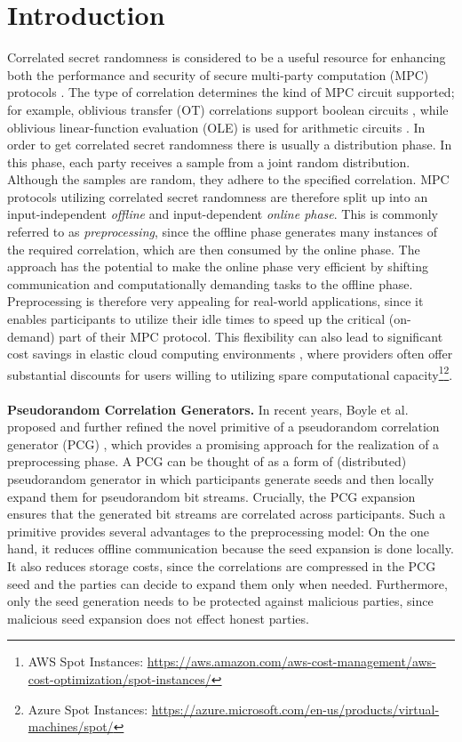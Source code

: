 \chapter{Introduction}
Correlated secret randomness is considered to be a useful resource for enhancing both the performance and security of secure multi-party computation (MPC) protocols \cite{ishai2013power}. The type of correlation determines the kind of MPC circuit supported; for example, oblivious transfer (OT) correlations support boolean circuits \cite{goldreich2019play}, while oblivious linear-function evaluation (OLE) is used for arithmetic circuits \cite{ishai2009secure}. In order to get correlated secret randomness there is usually a distribution phase. In this phase, each party receives a sample from a joint random distribution. Although the samples are random, they adhere to the specified correlation. MPC protocols utilizing correlated secret randomness are therefore split up into an input-independent \textit{offline} and input-dependent \textit{online phase}. This is commonly referred to as \textit{preprocessing}, since the offline phase generates many instances of the required correlation, which are then consumed by the online phase. The approach has the potential to make the online phase very efficient by shifting communication and computationally demanding tasks to the offline phase. Preprocessing is therefore very appealing for real-world applications, since it enables participants to utilize their idle times to speed up the critical (on-demand) part of their MPC protocol. This flexibility can also lead to significant cost savings in elastic cloud computing environments \cite{coutinho2015elasticity}, where providers often offer substantial discounts for users willing to utilizing spare computational capacity\footnote{AWS Spot Instances: \url{https://aws.amazon.com/aws-cost-management/aws-cost-optimization/spot-instances/}}\footnote{Azure Spot Instances: \url{https://azure.microsoft.com/en-us/products/virtual-machines/spot/}}.
\\\\
\textbf{Pseudorandom Correlation Generators.} In recent years, Boyle et al. proposed and further refined the novel primitive of a pseudorandom correlation generator (PCG) \cite{boyle2015function, boyle2016function, boyle2020efficient}, which provides a promising approach for the realization of a preprocessing phase. A PCG can be thought of as a form of (distributed) pseudorandom generator in which participants generate seeds and then locally expand them for pseudorandom bit streams. Crucially, the PCG expansion ensures that the generated bit streams are correlated across participants. Such a primitive provides several advantages to the preprocessing model: On the one hand, it reduces offline communication because the seed expansion is done locally. It also reduces storage costs, since the correlations are compressed in the PCG seed and the parties can decide to expand them only when needed. Furthermore, only the seed generation needs to be protected against malicious parties, since malicious seed expansion does not effect honest parties.
